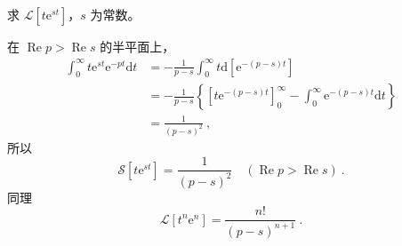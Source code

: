 \begin{example}{}
求 $\mathscr L[t\mathrm e^{st}]$，$s$ 为常数。

在 $\operatorname{Re} p>\operatorname{Re} s$ 的半平面上，
\begin{equation}
\begin{aligned} \int_{0}^{\infty} t \mathrm{e}^{s t} \mathrm{e}^{-p t} \mathrm{d} t &=-\frac{1}{p-s} \int_{0}^{\infty} t \mathrm{d}\left[\mathrm{e}^{-(p-s) t}\right] \\ &=-\frac{1}{p-s}\left\{\left[t \mathrm{e}^{-(p-s) t}\right]_{0}^{\infty}-\int_{0}^{\infty} \mathrm{e}^{-(p-s) t} \mathrm{d} t\right\} \\ &=\frac{1}{(p-s)^{2}} ~,\end{aligned}
\end{equation}
所以
\begin{equation}
\mathscr{S}\left[t \mathrm{e}^{s t}\right]=\frac{1}{(p-s)^{2}} \quad(\operatorname{Re} p>\operatorname{Re} s)~.
\end{equation}
同理
\begin{equation}
\mathscr{L}\left[t^{n} \mathrm{e}^{n}\right]=\frac{n !}{(p-s)^{n+1}}~.
\end{equation}
\end{example}
